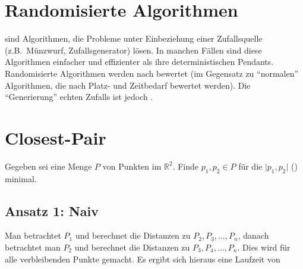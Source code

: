 \documentclass{scrartcl}%
\begin{document}
    \section*{Randomisierte Algorithmen}

     sind Algorithmen,
    die Probleme unter Einbeziehung einer Zufallsquelle (z.B.\ Münzwurf, Zufallsgenerator) lösen.
    In manchen Fällen sind diese Algorithmen einfacher und effizienter
    als ihre deterministischen Pendants.\\

    Randomisierte Algorithmen werden nach  bewertet
    (im Gegensatz zu "`normalen"' Algorithmen, die nach Platz- und Zeitbedarf bewertet werden).
    Die "`Generierung"' echten Zufalls ist jedoch .

    \section*{Closest-Pair}

    Gegeben sei eine Menge $P$ von Punkten im $\mathbb{R}^2$.
    Finde $p_1,p_2 \in P$ für die $\vert p_{1},p_2 \vert $ () minimal.

    \begin{figure}[htb]
        \centering
    \end{figure}

    \subsection*{Ansatz 1: Naiv}
    Man betrachtet $P_1$ und berechnet die Distanzen zu $P_2, P_3, \dots, P_n$,
    danach betrachtet man $P_2$ und berechnet die Distanzen zu $P_3, P_4, \dots, P_n$.
    Dies wird für alle verbleibenden Punkte gemacht.
    Es ergibt sich hieraus eine Laufzeit von
\end{document}
